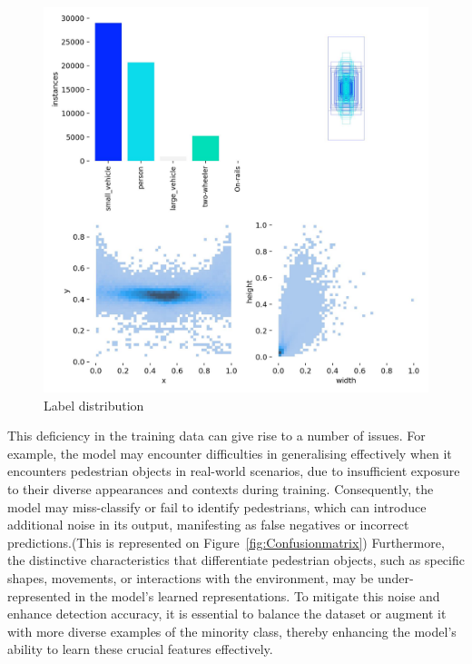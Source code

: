 \begin{figure}[ht]
    \centering
    \includegraphics[width=0.8\linewidth]{figures/labels-30}
    \caption{Label distribution}
    \label{fig:Label_distribution}
\end{figure}

This deficiency in the training data can give rise to a number of issues.
For example, the model may encounter difficulties in generalising effectively when it encounters pedestrian objects in real-world scenarios, due to insufficient exposure to their diverse appearances and contexts during training.
Consequently, the model may miss-classify or fail to identify pedestrians, which can introduce additional noise in its output, manifesting as false negatives or incorrect predictions.(This is represented on Figure~\ref{fig:Confusionmatrix})
Furthermore, the distinctive characteristics that differentiate pedestrian objects, such as specific shapes, movements, or interactions with the environment, may be under-represented in the model's learned representations.
To mitigate this noise and enhance detection accuracy, it is essential to balance the dataset or augment it with more diverse examples of the minority class, thereby enhancing the model's ability to learn these crucial features effectively.

